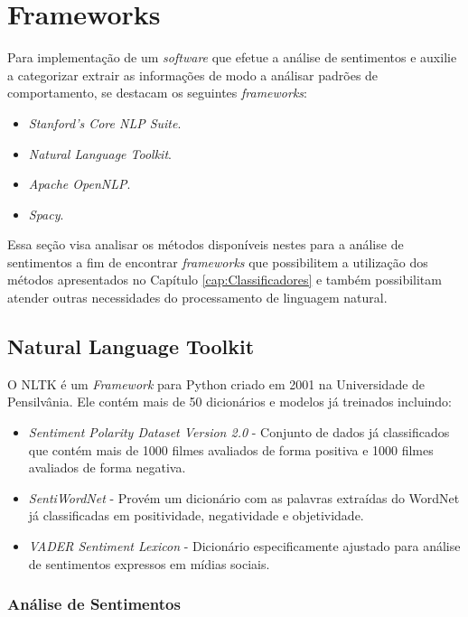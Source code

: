 \chapter{Frameworks}
\label{cap:Frameworks}

Para implementação de um \textit{software} que efetue a análise de sentimentos e
auxilie a categorizar extrair as informações de modo a análisar padrões de
comportamento, se destacam os seguintes \textit{frameworks}:

\begin{itemize}
\item \textit{Stanford's Core NLP Suite}.
\item \textit{Natural Language Toolkit}.
\item \textit{Apache OpenNLP}.
\item \textit{Spacy}.
\end{itemize}

Essa seção visa analisar os métodos
disponíveis nestes para a análise de sentimentos a fim de encontrar \textit{frameworks}
que possibilitem a utilização dos métodos apresentados no
Capítulo \ref{cap:Classificadores} e também possibilitam atender outras
necessidades do processamento de linguagem natural.


\section{Natural Language Toolkit}

O \ac{NLTK} é um \textit{Framework} para Python
criado em 2001 na Universidade de Pensilvânia. Ele contém mais de 50 dicionários
e modelos já treinados incluindo:

\begin{itemize}
  \item \textit{Sentiment Polarity Dataset Version 2.0} - Conjunto de dados já
  classificados que contém mais de 1000 filmes avaliados de forma positiva e
  1000 filmes avaliados de forma negativa.
  \item \textit{SentiWordNet} - Provém um dicionário com as palavras extraídas
  do WordNet já classificadas em positividade, negatividade e objetividade.
  \item \textit{VADER Sentiment Lexicon} - Dicionário especificamente ajustado
  para análise de sentimentos expressos em mídias sociais.
\end{itemize}


\subsection{Análise de Sentimentos}

